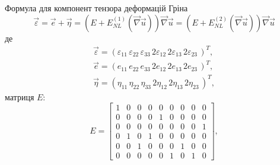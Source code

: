\documentclass[10pt,a4paper]{article}
\numberwithin{figure}{section}
\numberwithin{equation}{section}
\begin{document}
Формула для компонент тензора деформацій Гріна
\begin{equation}
\vec{\varepsilon}=\vec{e}+\vec{\eta}=\left(E + E_{NL}^{(1)} \left(\vec {\nabla} \vec{u} \right) \right)\vec {\nabla} \vec{u}=\left(E + E_{NL}^{(2)} \left(\vec {\nabla} \vec{u} \right) \right)\vec {\nabla} \vec{u}
\end{equation}
де 
\begin{align}
\vec{\varepsilon} = \left(
\varepsilon_{11}\,
\varepsilon_{22}\,
\varepsilon_{33}\,
2\varepsilon_{12}\,
2\varepsilon_{13}\,
2\varepsilon_{23}\,
\right)^T,\\
\vec{e} = \left( 
e_{11}\,
e_{22}\,
e_{33}\,
2e_{12}\,
2e_{13}\,
2e_{23}\,
\right)^T,\\
\vec{\eta} = \left( 
\eta_{11}\,
\eta_{22}\,
\eta_{33}\,
2\eta_{12}\,
2\eta_{13}\,
2\eta_{23}\,
\right)^T,
\end{align}
матриця $E$:
\begin{equation}
E=\left[\begin{matrix}1 & 0 & 0 & 0 & 0 & 0 & 0 & 0 & 0\\0 & 0 & 0 & 0 & 1 & 0 & 0 & 0 & 0\\0 & 0 & 0 & 0 & 0 & 0 & 0 & 0 & 1\\0 & 1 & 0 & 1 & 0 & 0 & 0 & 0 & 0\\0 & 0 & 1 & 0 & 0 & 0 & 1 & 0 & 0\\0 & 0 & 0 & 0 & 0 & 1 & 0 & 1 & 0\end{matrix}\right],
\end{equation}
\end{document}
